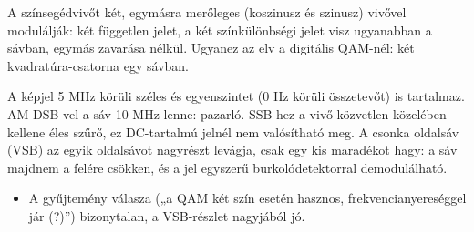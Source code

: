 A színsegédvivőt két, egymásra merőleges (koszinusz és szinusz) vivővel modulálják: két független jelet, a két színkülönbségi jelet visz ugyanabban a sávban, egymás zavarása nélkül. Ugyanez az elv a digitális QAM-nél: két kvadratúra-csatorna egy sávban.

A képjel 5 MHz körüli széles és egyenszintet (0 Hz körüli összetevőt) is tartalmaz. AM-DSB-vel a sáv 10 MHz lenne: pazarló. SSB-hez a vivő közvetlen közelében kellene éles szűrő, ez DC-tartalmú jelnél nem valósítható meg. A csonka oldalsáv (VSB) az egyik oldalsávot nagyrészt levágja, csak egy kis maradékot hagy: a sáv majdnem a felére csökken, és a jel egyszerű burkolódetektorral demodulálható.
\begin{eredmeny}

\begin{center}\end{center}
\end{eredmeny}
\begin{tipp}[Ellenőrzés]
\begin{itemize}
\item A gyűjtemény válasza („a QAM két szín esetén hasznos, frekvencianyereséggel jár (?)”) bizonytalan, a VSB-részlet nagyjából jó.
\end{itemize}
\end{tipp}
